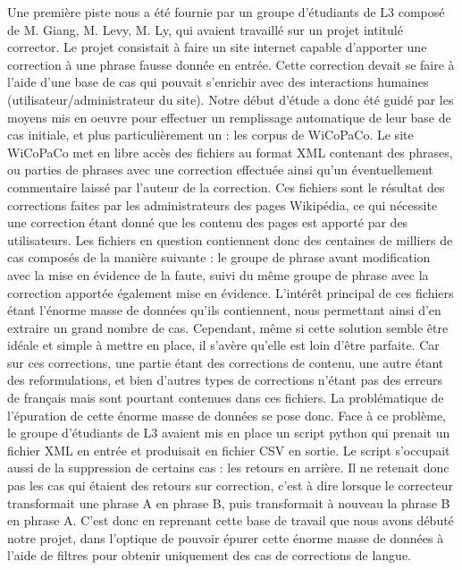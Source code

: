 \documentclass{article}
\begin{document}
Une premi\`{e}re piste nous a \'{e}t\'{e} fournie par un groupe d'\'{e}tudiants de L3 compos\'{e} de M. Giang, M. Levy, M. Ly, qui avaient travaill\'{e} sur un projet intitul\'{e} corrector. Le projet consistait \`{a} faire un site internet capable d'apporter une correction \`{a} une phrase fausse donn\'{e}e en entr\'{e}e. Cette correction devait se faire \`{a} l'aide d'une base de cas qui pouvait s'enrichir avec des interactions humaines (utilisateur/administrateur du site). 
\newline
\newline
Notre d\'{e}but d'\'{e}tude a donc \'{e}t\'{e} guid\'{e} par les moyens mis en oeuvre pour effectuer un remplissage automatique de leur base de cas initiale, et plus particuli\`{e}rement un : les corpus de WiCoPaCo. Le site WiCoPaCo met en libre acc\`{e}s des fichiers au format XML contenant des phrases, ou parties de phrases avec une correction effectu\'{e}e ainsi qu'un \'{e}ventuellement commentaire laiss\'{e} par l'auteur de la correction. Ces fichiers sont le r\'{e}sultat des corrections faites par les administrateurs des pages Wikip\'{e}dia, ce qui n\'{e}cessite une correction \'{e}tant donn\'{e} que les contenu des pages est apport\'{e} par des utilisateurs. Les fichiers en question contiennent donc des centaines de milliers de cas compos\'{e}s de la mani\`{e}re suivante : le groupe de phrase avant modification avec la mise en \'{e}vidence de la faute, suivi du m\^eme groupe de phrase avec la correction apport\'{e}e \'{e}galement mise en \'{e}vidence. 
\newline
\newline
L'int\'{e}r\^et principal de ces fichiers \'{e}tant l'\'{e}norme masse de donn\'{e}es qu'ils contiennent, nous permettant ainsi d'en extraire un grand nombre de cas. Cependant, m\^eme si cette solution semble \^etre id\'{e}ale et simple \`{a} mettre en place, il s'av\`{e}re qu'elle est loin d'\^etre parfaite. Car sur ces corrections, une partie \'{e}tant des corrections de contenu, une autre \'{e}tant des reformulations, et bien d'autres types de corrections n'\'{e}tant pas des erreurs de français mais sont pourtant contenues dans ces fichiers. La probl\'{e}matique de l'\'{e}puration de cette \'{e}norme masse de donn\'{e}es se pose donc.
\newline
\newline
Face \`{a} ce probl\`{e}me, le groupe d'\'{e}tudiants de L3 avaient mis en place un script python qui prenait un fichier XML en entr\'{e}e et produisait en fichier CSV en sortie. Le script s'occupait aussi de la suppression de certains cas : les retours en arri\`{e}re. Il ne retenait donc pas les cas qui \'{e}taient des retours sur correction, c'est \`{a} dire lorsque le correcteur transformait une phrase A en phrase B, puis transformait \`{a} nouveau la phrase B en phrase A.
\newline
\newline
C'est donc en reprenant cette base de travail que nous avons d\'{e}but\'{e} notre projet, dans l'optique de pouvoir \'{e}purer cette \'{e}norme masse de donn\'{e}es \`{a} l'aide de filtres pour obtenir uniquement des cas de corrections de langue. 
\end{document}
